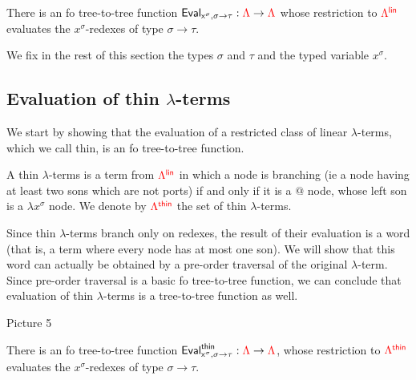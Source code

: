 \begin{theorem}\label{thm:evalOneType}
There is an fo tree-to-tree function ${\sf{Eval}_{x^\sigma,\sigma\rightarrow\tau}}:{\color{red}{\Lambda}} \to{\color{red}{\Lambda}}$ whose restriction to ${\color{red}{\Lambda^{\sf{lin}}}}$ evaluates the  $x^\sigma$-redexes of type $\sigma\rightarrow\tau$.
\end{theorem}

We fix in the rest of this section the types $\sigma$ and $\tau$ and the typed variable $x^\sigma$.

\subsection{Evaluation of thin $\lambda$-terms}

We start by showing that the evaluation of a restricted class of linear $\lambda$-terms, which we call thin, is an fo tree-to-tree function.   

\begin{definition}
A thin $\lambda$-terms is a term from ${\color{red}{\Lambda^{\sf{lin}}}}$ in which a node is branching (ie a node having at least two sons which are not ports) if and only if it is a $\text{@}$ node, whose left son is a $\lambda x^\sigma$ node. We denote by ${\color{red}{\Lambda^{\sf{thin}}}}$ the set of thin $\lambda$-terms.
\end{definition}

Since thin $\lambda$-terms branch only on redexes, the result of their evaluation is a word (that is, a term where every node has at most one son).  We will show that this word can actually be obtained by a pre-order traversal of the original $\lambda$-term. 
Since pre-order traversal is a basic fo tree-to-tree function, we can conclude that evaluation of thin $\lambda$-terms is a tree-to-tree function as well. 

\begin{center}
Picture 5
\end{center}

\begin{proposition}\label{prop:EvaluateThin}
There is an fo tree-to-tree function ${\sf{Eval}^{\sf{thin}}_{x^\sigma,\sigma\rightarrow\tau}}:{\color{red}{\Lambda}}\to{\color{red}{\Lambda}}$, whose restriction to ${\color{red}{\Lambda^{\sf{thin}}}}$ evaluates the $x^\sigma$-redexes of type $\sigma\rightarrow\tau$.
\end{proposition}

